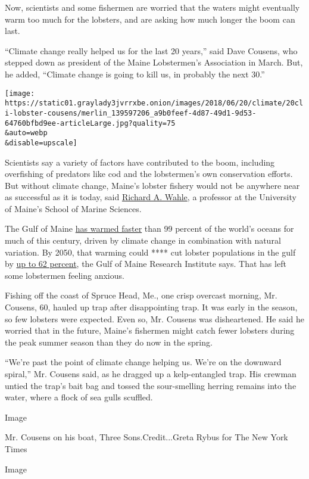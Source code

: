 Now, scientists and some fishermen are worried that the waters might
eventually warm too much for the lobsters, and are asking how much
longer the boom can last.

``Climate change really helped us for the last 20 years,'' said Dave
Cousens, who stepped down as president of the Maine Lobstermen's
Association in March. But, he added, ``Climate change is going to kill
us, in probably the next 30.''

\texttt{[image: https://static01.graylady3jvrrxbe.onion/images/2018/06/20/climate/20cli-lobster-cousens/merlin\_139597206\_a9b0feef-4d87-49d1-9d53-64760bfbd9ee-articleLarge.jpg?quality=75\\\&auto=webp\\\&disable=upscale]}

Scientists say a variety of factors have contributed to the boom,
including overfishing of predators like cod and the lobstermen's own
conservation efforts. But without climate change, Maine's lobster
fishery would not be anywhere near as successful as it is today, said
\href{https://umaine.edu/wahlelab/}{Richard A. Wahle}, a professor at
the University of Maine's School of Marine Sciences.

The Gulf of Maine
\href{http://science.sciencemag.org/content/350/6262/809}{has warmed
faster} than 99 percent of the world's oceans for much of this century,
driven by climate change in combination with natural variation. By 2050,
that warming could **** cut lobster populations in the gulf by
\href{http://www.pnas.org/content/115/8/1831}{up to 62 percent}, the
Gulf of Maine Research Institute says. That has left some lobstermen
feeling anxious.

Fishing off the coast of Spruce Head, Me., one crisp overcast morning,
Mr. Cousens, 60, hauled up trap after disappointing trap. It was early
in the season, so few lobsters were expected. Even so, Mr. Cousens was
disheartened. He said he worried that in the future, Maine's fishermen
might catch fewer lobsters during the peak summer season than they do
now in the spring.

``We're past the point of climate change helping us. We're on the
downward spiral,'' Mr. Cousens said, as he dragged up a kelp-entangled
trap. His crewman untied the trap's bait bag and tossed the
sour-smelling herring remains into the water, where a flock of sea gulls
scuffled.

Image

Mr. Cousens on his boat, Three Sons.Credit...Greta Rybus for The New
York Times

Image

